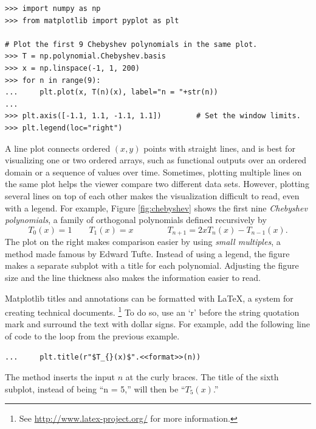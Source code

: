 \begin{lstlisting}
>>> import numpy as np
>>> from matplotlib import pyplot as plt

# Plot the first 9 Chebyshev polynomials in the same plot.
>>> T = np.polynomial.Chebyshev.basis
>>> x = np.linspace(-1, 1, 200)
>>> for n in range(9):
...     plt.plot(x, T(n)(x), label="n = "+str(n))
...
>>> plt.axis([-1.1, 1.1, -1.1, 1.1])        # Set the window limits.
>>> plt.legend(loc="right")
\end{lstlisting}

A line plot connects ordered $(x,y)$ points with straight lines, and is best for visualizing one or two ordered arrays, such as functional outputs over an ordered domain or a sequence of values over time.
Sometimes, plotting multiple lines on the same plot helps the viewer compare two different data sets.
However, plotting several lines on top of each other makes the visualization difficult to read, even with a legend.
For example, Figure \ref{fig:chebyshev} shows the first nine \emph{Chebyshev polynomials}, a family of orthogonal polynomials defined recursively by \[T_0(x) = 1 \qquad T_1(x) = x \qquad\qquad T_{n+1} = 2xT_n(x) - T_{n-1}(x).\]
The plot on the right makes comparison easier by using \emph{small multiples}, a method made famous by Edward Tufte.
Instead of using a legend, the figure makes a separate subplot with a title for each polynomial.
Adjusting the figure size and the line thickness also makes the information easier to read.


\begin{info} %
Matplotlib titles and annotations can be formatted with \LaTeX, a system for creating technical documents.%
\footnote{See \url{http://www.latex-project.org/} for more information.}
To do so, use an `r' before the string quotation mark and surround the text with dollar signs.
For example, add the following line of code to the loop from the previous example.

\begin{lstlisting}
...     plt.title(r"$T_{}(x)$".<<format>>(n))
\end{lstlisting}

The  method inserts the input $n$ at the curly braces.
The title of the sixth subplot, instead of being ``n = 5,'' will then be ``$T_5(x)$.''
\end{info}

